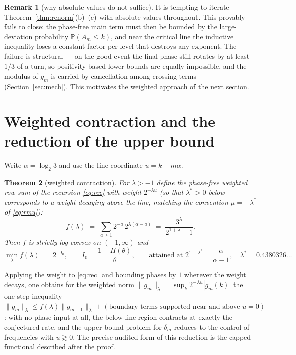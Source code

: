 \documentclass[11pt]{article}
\newtheorem{theorem}{Theorem}[section]
\theoremstyle{definition}
\newtheorem{remark}[theorem]{Remark}
\newcommand{\Prob}{\mathbb{P}}
\begin{document}
\begin{remark}[why absolute values do not suffice]\label{rem:noabs}
It is tempting to iterate Theorem~\ref{thm:renorm}(b)--(c) with absolute
values throughout. This provably fails to close: the phase-free main term
must then be bounded by the large-deviation probability
$\Prob(A_m\le k)$, and near the critical line the inductive inequality
loses a constant factor per level that destroys any exponent. The failure
is structural --- on the good event the final phase still rotates by at
least $1/3$ of a turn, so positivity-based lower bounds are equally
impossible, and the modulus of $g_m$ is carried by cancellation among
crossing terms (Section~\ref{sec:mech}). This motivates the weighted
approach of the next section.
\end{remark}

\section{Weighted contraction and the reduction of the upper bound}
\label{sec:weight}

Write $\alpha=\log_2 3$ and use the line coordinate $u=k-m\alpha$.

\begin{theorem}[weighted contraction]\label{thm:weight}
For $\lambda>-1$ define the phase-free weighted row sum of the recursion
\eqref{eq:rec} with weight $2^{-\lambda u}$ (so that $\lambda^*>0$ below
corresponds to a weight decaying above the line, matching the convention
$\mu=-\lambda^*$ of \eqref{eq:rmu}):
\[
f(\lambda)\;=\;\sum_{a\ge 1}2^{-a}\,2^{\lambda(\alpha-a)}
\;=\;\frac{3^{\lambda}}{2^{1+\lambda}-1}.
\]
Then $f$ is strictly log-convex on $(-1,\infty)$ and
\[
\min_{\lambda}f(\lambda)\;=\;2^{-I_0},\qquad
I_0=\frac{1-H(\theta)}{\theta},\qquad
\text{attained at } 2^{1+\lambda^*}=\frac{\alpha}{\alpha-1},\quad
\lambda^*=0.4380326\ldots
\]
\end{theorem}

Applying the weight to \eqref{eq:rec} and bounding phases by $1$
wherever the weight decays, one obtains for the weighted norm
$\|g_m\|_{\lambda}=\sup_k 2^{-\lambda u}|g_m(k)|$ the one-step inequality
$\|g_m\|_{\lambda}\le f(\lambda)\|g_{m-1}\|_{\lambda}+(\text{boundary
terms supported near and above } u=0)$: with no phase input at all, the
below-line region contracts at exactly the conjectured rate, and the
upper-bound problem for $\delta_m$ reduces to the control of frequencies
with $u\gtrsim 0$. The precise audited form of this reduction is the
capped functional described after the proof.
\end{document}
